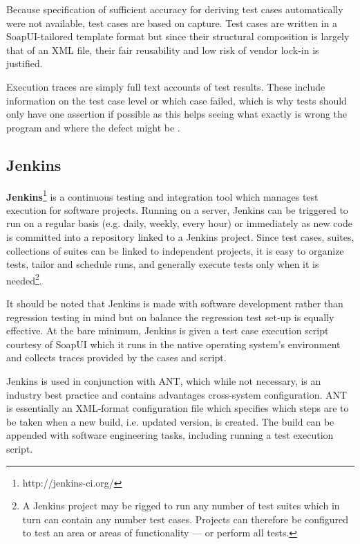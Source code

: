 \documentclass[12pt,a4paper,oneside,pdftex]{report}
\begin{document}
{Because specification of sufficient accuracy for deriving test cases automatically were not available, test cases are based on capture. Test cases are written in a SoapUI-tailored template format but since their structural composition is largely that of an XML file, their fair reusability and low risk of vendor lock-in is justified. 

Execution traces are simply full text accounts of test results. These include information on the test case level or which case failed, which is why tests should only have one assertion if possible as this helps seeing what exactly is wrong the program and where the defect might be \citep{duvall2007continuous}.

\subsection{Jenkins}

\textbf{Jenkins}\footnote{http://jenkins-ci.org/} is a continuous testing and integration tool which manages test execution for software projects. Running on a server, Jenkins can be triggered to run on a regular basis (e.g. daily, weekly, every hour) or immediately as new code is committed into a repository linked to a Jenkins project. Since test cases, suites, collections of suites can be linked to independent projects, it is easy to organize tests, tailor and schedule runs, and generally execute tests only when it is needed\footnote{A Jenkins project may be rigged to run any number of test suites which in turn can contain any number test cases. Projects can therefore be configured to test an area or areas of functionality --- or perform all tests.}.

It should be noted that Jenkins is made with software development rather than regression testing in mind but on balance the regression test set-up is equally effective. At the bare minimum, Jenkins is given a test case execution script courtesy of SoapUI which it runs in the native operating system's environment and collects traces provided by the cases and script.

Jenkins is used in conjunction with ANT, which while not necessary, is an industry best practice and contains advantages cross-system configuration. ANT is essentially an XML-format configuration file which specifies which steps are to be taken when a new build, i.e. updated version, is created. The build can be appended with software engineering tasks, including running a test execution script. 

}
\end{document}
